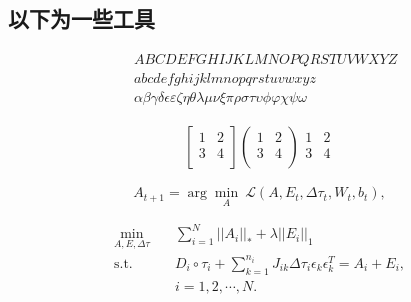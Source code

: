 \documentclass[UTF8,a4paper,11pt,onecolumn,twoside]{ctexart}
\begin{document}
\begin{multicols}{2}
\section{以下为一些工具}
\begin{align}
& ABCDEFGHIJKLMNOPQRSTUVWXYZ \label{eq:alphabet} \\
& abcdefghijklmnopqrstuvwxyz \\
& \alpha \beta \gamma \delta \epsilon \varepsilon \zeta \eta \theta \lambda \mu \nu \xi \pi \rho \sigma \tau \upsilon \phi \varphi \chi \psi \omega  
\end{align}

\begin{align}
\begin{bmatrix}
1 & 2 \\
3 & 4 \\
\end{bmatrix}
\begin{pmatrix}
1 & 2 \\
3 & 4 \\
\end{pmatrix}
\begin{matrix}
1 & 2 \\
3 & 4 \\
\end{matrix}
\end{align}

\begin{equation}
A_{t+1} = \arg\min_A \ \mathcal{L}(A,E_t,\Delta\tau_t,W_t,b_t), \nonumber
\end{equation}

\begin{equation}
\begin{aligned} \label{eq:rasl}
\min_{A,E,\Delta \tau} \quad & \sum_{i=1}^{N}||A_i||_* + \lambda ||E_i||_1  \\
\mathrm{s.t.} \quad & D_i \circ \tau_i + \sum_{k=1}^{n_i} J_{ik} \Delta \tau_i \epsilon_k \epsilon_k^T = A_i + E_i, \\
& i = 1,2,\cdots,N. 
\end{aligned}
\end{equation}


\end{multicols}
\end{document}
